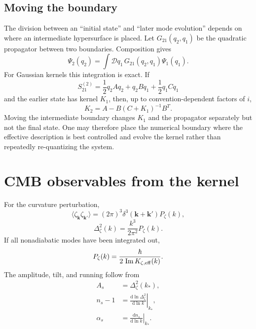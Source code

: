 \documentclass[11pt,a4paper]{article}
\newcommand{\dd}{\mathrm d}
\begin{document}
\subsection{Moving the boundary}
The division between an ``initial state'' and ``later mode evolution'' depends on where an intermediate hypersurface is placed. Let $G_{21}(q_2,q_1)$ be the quadratic propagator between two boundaries. Composition gives
\begin{equation}
\Psi_2(q_2)=\int\mathcal Dq_1\,G_{21}(q_2,q_1)\Psi_1(q_1).
\end{equation}
For Gaussian kernels this integration is exact. If
\begin{equation}
S_{21}^{(2)}=\frac12q_2Aq_2+q_2Bq_1+\frac12q_1Cq_1
\end{equation}
and the earlier state has kernel $K_1$, then, up to convention-dependent factors of $i$,
\begin{equation}
K_2=A-B(C+K_1)^{-1}B^T.
\label{eq:compose}
\end{equation}
Moving the intermediate boundary changes $K_1$ and the propagator separately but not the final state. One may therefore place the numerical boundary where the effective description is best controlled and evolve the kernel rather than repeatedly re-quantizing the system.

\section{CMB observables from the kernel}
\label{sec:observables}

For the curvature perturbation,
\begin{equation}
\langle\zeta_{\bm k}\zeta_{\bm k'}\rangle
=(2\pi)^3\delta^3(\bm k+\bm k')P_\zeta(k),
\end{equation}
\begin{equation}
\Delta_\zeta^2(k)=\frac{k^3}{2\pi^2}P_\zeta(k).
\end{equation}
If all nonadiabatic modes have been integrated out,
\begin{equation}
P_\zeta(k)=\frac{\hbar}{2\,\operatorname{Im}K_{\zeta,\rm eff}(k)}.
\label{eq:pzeta}
\end{equation}
The amplitude, tilt, and running follow from
\begin{align}
A_s&=\Delta_\zeta^2(k_*),\\
n_s-1&=\left.\frac{\dd\ln\Delta_\zeta^2}{\dd\ln k}\right|_{k_*},\\
\alpha_s&=\left.\frac{\dd n_s}{\dd\ln k}\right|_{k_*}.
\end{align}
\end{document}
